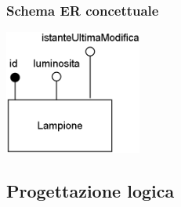 \subsubsection{Schema ER concettuale}

\begin{center}
    \includegraphics[width=4.5cm]{contenuti/specifica-basi-dati/img-sbd/coordinazione_concettuale.png}
\end{center}

\subsection{Progettazione logica}